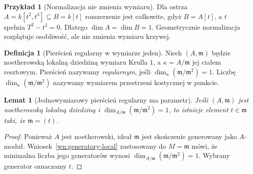\documentclass[11pt,a4paper,openany]{report}
\numberwithin{equation}{section}
\theoremstyle{plain}
\newtheorem{lemat}[twierdzenie]{Lemat}
\theoremstyle{definition}
\newtheorem{definicja}[twierdzenie]{Definicja}
\newtheorem{przyklad}[twierdzenie]{Przykład}
\theoremstyle{remark}
\begin{document}
\begin{przyklad}[Normalizacja nie zmienia wymiaru]
Dla ostrza $A=k[t^2,t^3]\subseteq B=k[t]$ rozszerzenie
jest całkowite, gdyż $B=A[t]$, a $t$ spełnia
$T^2-t^2=0$. Dlatego $\dim A=\dim B=1$.
Geometrycznie normalizacja rozplątuje
osobliwość, ale nie zmienia wymiaru krzywej.
\end{przyklad}

\begin{definicja}[Pierścień regularny w wymiarze jeden]
Niech $(A,\mathfrak m)$ będzie noetherowską lokalną
dziedziną wymiaru Krulla $1$, a $\kappa=A/\mathfrak m$
jej ciałem resztowym. Pierścień nazywamy
\emph{regularnym}, jeśli
$\dim_\kappa(\mathfrak m/\mathfrak m^2)=1$.
Liczbę $\dim_\kappa(\mathfrak m/\mathfrak m^2)$
nazywamy wymiarem przestrzeni kostycznej w punkcie.
\end{definicja}

\begin{lemat}[Jednowymiarowy pierścień regularny ma parametr]
\label{lem:param-local}
Jeśli $(A,\mathfrak m)$ jest noetherowską lokalną
dziedziną i $\dim_{A/\mathfrak m}
(\mathfrak m/\mathfrak m^2)=1$, to istnieje
element $t\in\mathfrak m$ taki, że $\mathfrak m=(t)$.
\end{lemat}
\begin{proof}
Ponieważ $A$ jest noetherowski, ideał $\mathfrak m$
jest skończenie generowany jako $A$-moduł.
Wniosek~\ref{wn:generatory-local} zastosowany do
$M=\mathfrak m$ mówi, że minimalna liczba jego
generatorów wynosi
$\dim_{A/\mathfrak m}(\mathfrak m/\mathfrak m^2)=1$.
Wybrany generator oznaczamy $t$.
\end{proof}
\end{document}
